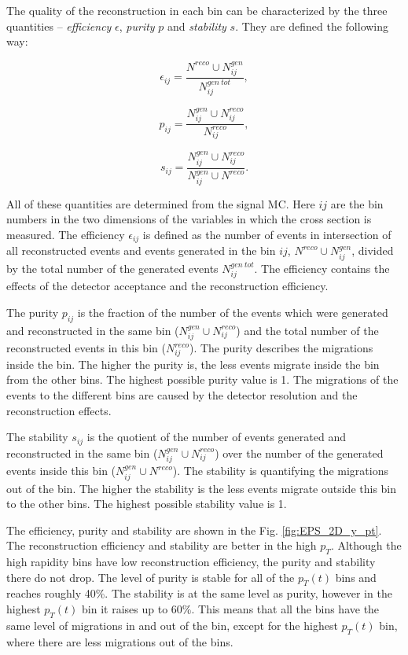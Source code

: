 The quality of the reconstruction in each bin can be characterized by the three quantities -- \textit{efficiency} $\epsilon$, \textit{purity} $p$ and
\textit{stability} $s$. They are defined the following way:

\begin{equation}
 \epsilon_{ij} = \frac{N^{reco} \cup N_{ij}^{gen}}{N_{ij}^{gen\:tot}},
\end{equation}

\begin{equation}
 p_{ij} = \frac{N_{ij}^{gen} \cup N_{ij}^{reco}}{N_{ij}^{reco}},
\end{equation}

\begin{equation}
 s_{ij} = \frac{N_{ij}^{gen} \cup N_{ij}^{reco}}{N_{ij}^{gen} \cup N^{reco}}.
\end{equation}

All of these quantities are determined from the signal MC. Here $ij$ are the bin numbers in the two dimensions of the variables in which
the cross section is measured. The efficiency 
$\epsilon_{ij}$ is defined as the number of events in intersection of all reconstructed events and events generated in the bin $ij$, 
$N^{reco} \cup N_{ij}^{gen}$, divided by the total number of the generated events $N_{ij}^{gen\:tot}$. 
The efficiency contains the effects of the detector acceptance and the reconstruction efficiency.

The purity $p_{ij}$ is the fraction of the number of the events which were generated and reconstructed in the same bin ($N_{ij}^{gen} \cup N_{ij}^{reco}$)
and the total number of the reconstructed events in this bin ($N_{ij}^{reco}$). The purity describes the migrations inside the bin.
The higher the purity is, the less events migrate inside the bin from the other bins. The highest possible purity value is 1.
The migrations of the events to the different bins are caused by the detector resolution and the reconstruction effects.

The stability $s_{ij}$ is the quotient of the number of events generated and reconstructed in the same bin ($N_{ij}^{gen} \cup N_{ij}^{reco}$) over the 
number of the generated events inside this bin ($N_{ij}^{gen} \cup N^{reco}$). The stability is quantifying the migrations out of the bin. The higher 
the stability is the less events migrate outside this bin to the other bins. The highest possible stability value is 1.

The efficiency, purity and stability are shown in the Fig. \ref{fig:EPS_2D_y_pt}. The reconstruction efficiency and stability are better in the
high $p_{T}$. Although the high rapidity bins have low reconstruction efficiency, the purity and stability there do not drop. The level of purity
is stable for all of the $p_{T}(t)$ bins and reaches roughly 40\%. The stability is at the same level as purity, however in the highest $p_{T}(t)$
bin it raises up to 60\%. This means that all the bins have the same level of migrations in and out of the bin, except for the highest $p_{T}(t)$
bin, where there are less migrations out of the bins.


